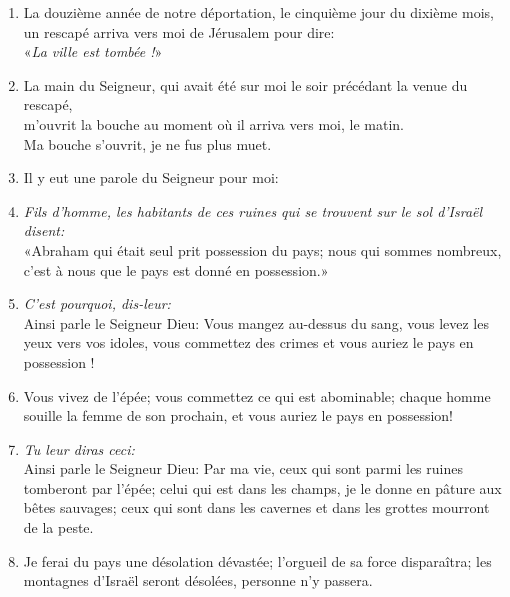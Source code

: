 \begin{enumerate}[leftmargin=\psleftmargin, labelsep = \pslabelsep, label={\arabic*}, font=\color{\pscolor}\small\textsuperscript, parsep=0em, itemsep=0em, topsep=0em ]
        \subsection*{Sur les habitants de Jérusalem en ruine}
  \item  {}La douzième année de notre déportation, le cinquième jour du dixième mois,\brk
        un rescapé arriva vers moi de Jérusalem pour dire: \\
        «\textit{La ville est tombée !}»
  \item La main du Seigneur, qui avait été sur moi le soir précédant la venue du rescapé, \\
        m’ouvrit la bouche au moment où il arriva vers moi, le matin. \\
        Ma bouche s’ouvrit, je ne fus plus muet. \verseSpace
  \item Il y eut une parole du Seigneur pour moi:
  \item {}\textit{Fils d’homme, les habitants de ces ruines qui se trouvent sur le sol d’Israël disent:} \\
        «Abraham qui était seul prit possession du pays; \brk
        nous qui sommes nombreux, c’est à nous que le pays est donné en possession.» \verseSpace
  \item {}\textit{C’est pourquoi, dis-leur:} \\
        Ainsi parle le Seigneur Dieu: \brk
        Vous mangez au-dessus du sang, \brk
        vous levez les yeux vers vos idoles, \brk
        vous commettez des crimes \brk
        et vous auriez le pays en possession !
  \item {}Vous vivez de l’épée; \brk
        vous commettez ce qui est abominable; \brk
        chaque homme souille la femme de son prochain, \brk
        et vous auriez le pays en possession! \verseSpace
  \item {}\textit{Tu leur diras ceci:} \\
        Ainsi parle le Seigneur Dieu: \brk
        Par ma vie, \brk
        ceux qui sont parmi les ruines tomberont par l’épée; \brk
        celui qui est dans les champs, je le donne en pâture aux bêtes sauvages; \brk
        ceux qui sont dans les cavernes et dans les grottes mourront de la peste.
  \item {}Je ferai du pays une désolation dévastée; \brk
        l’orgueil de sa force disparaîtra; \brk
        les montagnes d’Israël seront désolées, personne n’y passera.

\end{enumerate}
